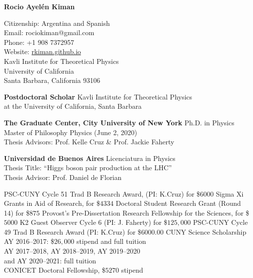 \documentclass[10pt]{cv}
\newcommand\tab[1][1cm]{\hspace*{#1}}
\newcommand{\firstpagestyle}{empty} %
\begin{document}
\thispagestyle{\firstpagestyle} 
\begin{center}
{\LARGE \textbf{\sc Rocio Ayel\'en Kiman}}\\
\bigskip
\bigskip
\end{center}
\normalsize
  
\addresses
{
Citizenship: Argentina and Spanish\\
Email: rociokiman@gmail.com\\
Phone: +1 908 7372957 \\
Website: \href{https://rkiman.github.io}{rkiman.github.io}\\
}
{
Kavli Institute for Theoretical Physics\\
University of California\\
Santa Barbara, California 93106
}

\begin{llist}


\textbf{Postdoctoral Scholar}
Kavli Institute for Theoretical Physics \\
at the University of California, Santa Barbara


\textbf{The Graduate Center, City University of New York}
Ph.D. in Physics\\
Master of Philosophy Physics (June 2, 2020)\\
Thesis Advisors: Prof. Kelle Cruz \& Prof. Jackie Faherty

\textbf{Universidad de Buenos Aires}
Licenciatura in Physics\\
Thesis Title: ``Higgs boson pair production at the LHC''\\
Thesis Advisor: Prof. Daniel de Florian




PSC-CUNY Cycle 51 Trad B Research Award, (PI: K.Cruz) for \$$6000$
Sigma Xi Grants in Aid of Research, for \$$4334$
Doctoral Student Research Grant (Round 14) for \$$875$    
Provost’s Pre-Dissertation Research Fellowship for the Sciences, for \$$5000$
K2 Guest Observer Cycle 6 (PI: J. Faherty) for \$$125,000$
PSC-CUNY Cycle 49 Trad B Research Award (PI: K.Cruz) for \$$6000.00$
CUNY Science Scholarship
\tab AY 2016–2017: \$$26,000$ stipend and full tuition\\
\tab AY 2017–2018, AY 2018–2019, AY 2019–2020\\ 
\tab and AY 2020–2021: full tuition\\
CONICET Doctoral Fellowship, \$$5270$ stipend



\end{llist}
\end{document}

